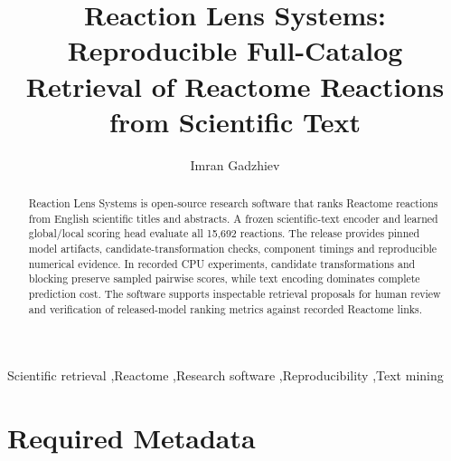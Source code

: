 \documentclass[preprint,12pt,a4paper]{elsarticle}
\begin{document}
\begin{frontmatter}
\title{Reaction Lens Systems: Reproducible Full-Catalog Retrieval of Reactome Reactions from Scientific Text}
\author{Imran Gadzhiev}
\address{Independent Researcher, Manchester, United Kingdom}
\begin{abstract}
Reaction Lens Systems is open-source research software that ranks Reactome
reactions from English scientific titles and abstracts. A frozen scientific-text
encoder and learned global/local scoring head evaluate all 15,692 reactions. The release
provides pinned model artifacts, candidate-transformation checks, component
timings and reproducible numerical evidence. In recorded CPU experiments,
candidate transformations and blocking preserve sampled pairwise scores, while
text encoding dominates complete prediction cost. The software supports
inspectable retrieval proposals for human review and verification of released-model
ranking metrics against recorded Reactome links.
\end{abstract}
\begin{keyword}
Scientific retrieval \sep Reactome \sep Research software \sep Reproducibility \sep Text mining
\end{keyword}
\end{frontmatter}
\linenumbers
\section*{Required Metadata}
\end{document}
